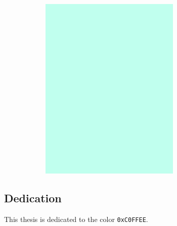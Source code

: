 
\begin{figure}[!t]
\centering
\includegraphics[width=3.5in,height=3.5in]{../media/c0ffee.png}
\label{c0ffee}
\end{figure}

\vspace*{\fill}
\begin{center}
\vspace*{-4.5in}
\section*{\large{Dedication}}
This thesis is dedicated to the color \verb|0xC0FFEE|.

\end{center}
\vspace*{\fill}

